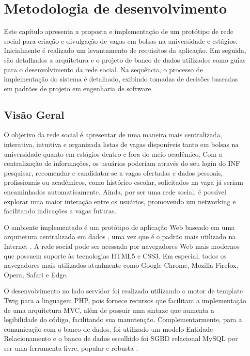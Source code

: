 \documentclass[cic,tc]{iiufrgs}
\begin{document}
\chapter{Metodologia de desenvolvimento}
\label{metodologiaDesenvolvimento}
Este capítulo apresenta a proposta e implementação de um protótipo de rede social para criação e divulgação de vagas em bolsas na universidade e estágios. Inicialmente é realizado um levantamento de requisitos da aplicação. Em seguida, são detalhados a arquitetura e o projeto de banco de dados utilizados como guias para o desenvolvimento da rede social. Na sequência, o processo de implementação do sistema é detalhado, exibindo tomadas de decisões baseadas em padrões de projeto em engenharia de software.

\section{Visão Geral}
\label{metodologiaVisaoGeral}
O objetivo da rede social é apresentar de uma maneira mais centralizada, interativa, intuitiva e organizada listas de vagas disponíveis tanto em bolsas na universidade quanto em estágios dentro e fora do meio acadêmico. Com a centralização de informações, os usuários poderiam através do seu login do INF pesquisar, recomendar e candidatar-se a vagas ofertadas e dados pessoais, profissionais ou acadêmicos, como histórico escolar, solicitados na vaga já seriam encaminhados automaticamente. Ainda, por ser uma rede social, é possível explorar uma maior interação entre os usuários, promovendo um networking e facilitando indicações a vagas futuras.

O ambiente implementado é um protótipo de aplicação Web baseado em uma arquitetura centralizada em dados \cite{pressman}, uma vez que é o padrão mais utilizado na Internet \cite{kurose}. A rede social pode ser acessada por navegadores Web mais modernos que possuem suporte às tecnologias HTML5 e CSS3. Em especial, todos os navegadores mais utilizados atualmente como Google Chrome, Mozilla Firefox, Opera, Safari e Edge.

O desenvolvimento no lado servidor foi realizado utilizando o motor de template Twig para a linguagem PHP, pois fornece recursos que facilitam a implementação de uma arquitetura MVC, além de possuir uma sintaxe que aumenta a legibilidade do código, facilitando sua manutenção. Complementarmente, para a comunicação com o banco de dados, foi utilizado um modelo Entidade-Relacionamento e o banco de dados escolhido foi SGBD relacional MySQL por ser uma ferramenta livre, popular e robusta \cite{mysql}.
\end{document}
